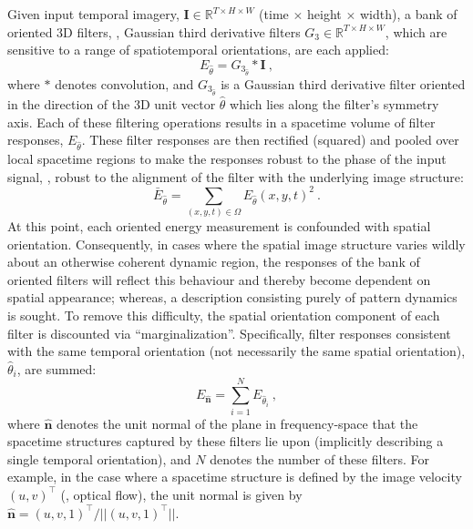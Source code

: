 Given input temporal imagery, $\mathbf{I} \in \mathbb{R}^{T \times H \times W}$ (time $\times$ height $\times$ width), a bank of oriented 3D
filters, \eg, Gaussian third derivative filters $G_3 \in \mathbb{R}^{T \times H \times W}$, which are sensitive to a range of
spatiotemporal orientations, are each applied:
\begin{equation}
	E_{\hat{\theta}} = G_{3_{\hat{\theta}}} \ast \mathbf{I}\ ,
\end{equation}
where $\ast$ denotes convolution, and $G_{3_{\hat{\theta}}}$ is a Gaussian third derivative filter oriented in the direction of the 3D unit vector $\hat{\theta}$ which lies along the filter's symmetry axis. Each of these filtering operations results in a spacetime volume of filter responses, $E_{\hat{\theta}}$.
These filter responses are then rectified (squared) and
pooled over local spacetime regions to make the responses robust
to the phase of the input signal, \ie, robust to the
alignment of the filter with the underlying image
structure:
\begin{equation}
	\bar{E}_{\hat{\theta}} = \sum_{(x, y, t) \in \Omega}{{E_{\hat{\theta}}(x, y, t)}^2}\ .
\end{equation}
At this point, each oriented energy measurement is confounded with spatial orientation. Consequently, in cases where the 
spatial image structure varies wildly about an otherwise coherent dynamic
region, the responses of the bank of oriented filters will reflect this
behaviour and thereby become dependent on spatial appearance; whereas, a description consisting purely 
of pattern dynamics is sought.
To remove this difficulty, the spatial orientation component of each filter is discounted via ``marginalization''. Specifically, filter responses consistent with the same temporal orientation (not necessarily the same spatial orientation), $\hat{\theta}_i$, are summed:
\begin{equation}
	E_{\hat{\mathbf{n}}} = \sum_{i = 1}^{N}{E_{\hat{\theta}_i}}\ ,
	\label{eq:oriented_filter_2.8}
\end{equation}
where $\hat{\mathbf{n}}$ denotes the unit normal of the plane in frequency-space that the spacetime structures captured by these filters lie upon (implicitly describing a single temporal orientation), and $N$ denotes the number of these filters.
For example, in the case where a spacetime structure is defined by the image velocity $(u, v)^\top$ (\ie, optical flow), the unit normal is given by $\hat{\mathbf{n}}=(u, v, 1)^\top / ||(u, v, 1)^\top||$.
